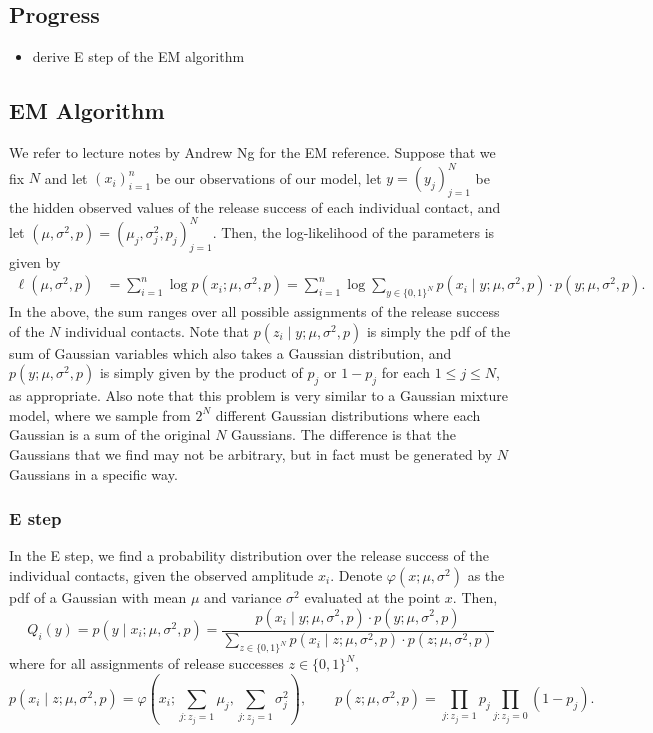 \documentclass{article}
\begin{document}
\subsection{Progress}
\begin{itemize}
  \item derive E step of the EM algorithm
\end{itemize}

\subsection{EM Algorithm}
We refer to lecture notes by Andrew Ng \cite{ng2016em} for the EM reference. Suppose that we fix $N$ and let $(x_i)_{i=1}^n$ be our observations of our model, let $y = (y_j)_{j=1}^N$ be the hidden observed values of the release success of each individual contact, and let $(\mu, \sigma^2, p) = (\mu_j,\sigma_j^2,p_j)_{j=1}^N$. Then, the log-likelihood of the parameters is given by
\begin{align*}
  \ell\left(\mu, \sigma^2, p\right) &= \sum_{i=1}^n\log p(x_i; \mu, \sigma^2, p) = \sum_{i=1}^n\log \sum_{y\in\{0,1\}^N} p(x_i\mid y;\mu,\sigma^2,p)\cdot p(y;\mu,\sigma^2,p).
\end{align*}
In the above, the sum ranges over all possible assignments of the release success of the $N$ individual contacts. Note that $p(z_i\mid y;\mu,\sigma^2,p)$ is simply the pdf of the sum of Gaussian variables which also takes a Gaussian distribution, and $p(y;\mu,\sigma^2,p)$ is simply given by the product of $p_j$ or $1-p_j$ for each $1\leq j\leq N$, as appropriate. Also note that this problem is very similar to a Gaussian mixture model, where we sample from $2^N$ different Gaussian distributions where each Gaussian is a sum of the original $N$ Gaussians. The difference is that the Gaussians that we find may not be arbitrary, but in fact must be generated by $N$ Gaussians in a specific way.

\subsubsection{E step}

In the E step, we find a probability distribution over the release success of the individual contacts, given the observed amplitude $x_i$. Denote $\varphi(x;\mu,\sigma^2)$ as the pdf of a Gaussian with mean $\mu$ and variance $\sigma^2$ evaluated at the point $x$. Then,
\[
  Q_i(y) = p(y\mid x_i; \mu, \sigma^2, p) = \frac{p(x_i\mid y; \mu,\sigma^2,p)\cdot p(y;\mu,\sigma^2,p)}{\sum_{z\in\{0,1\}^N} p(x_i\mid z;\mu,\sigma^2,p)\cdot p(z;\mu,\sigma^2,p)}
\]
where for all assignments of release successes $z\in\{0,1\}^N$,
\[
  p(x_i\mid z; \mu,\sigma^2,p) = \varphi\left(x_i;\sum_{j:z_j=1} \mu_j, \sum_{j:z_j=1} \sigma_j^2\right),\qquad p(z;\mu,\sigma^2,p) = \prod_{j:z_j=1}p_j\prod_{j:z_j=0}(1-p_j).
\]
\end{document}
